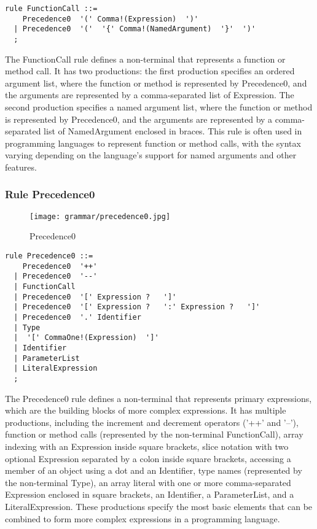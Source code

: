 \begin{lstlisting}
rule FunctionCall ::=
    Precedence0  '(' Comma!(Expression)  ')' 
  | Precedence0  '('  '{' Comma!(NamedArgument)  '}'  ')' 
  ;
\end{lstlisting}

The FunctionCall rule defines a non-terminal that represents a function or method call. It has two productions: the first production specifies an ordered argument list, where the function or method is represented by Precedence0, and the arguments are represented by a comma-separated list of Expression. The second production specifies a named argument list, where the function or method is represented by Precedence0, and the arguments are represented by a comma-separated list of NamedArgument enclosed in braces. This rule is often used in programming languages to represent function or method calls, with the syntax varying depending on the language's support for named arguments and other features.

\subsubsection*{Rule Precedence0}

\begin{figure}[!ht]
\centering
\texttt{[image: grammar/precedence0.jpg]}
\caption{Precedence0}
\end{figure}

\begin{lstlisting}
rule Precedence0 ::=
    Precedence0  '++' 
  | Precedence0  '--' 
  | FunctionCall 
  | Precedence0  '[' Expression ?   ']' 
  | Precedence0  '[' Expression ?   ':' Expression ?   ']' 
  | Precedence0  '.' Identifier 
  | Type 
  |  '[' CommaOne!(Expression)  ']' 
  | Identifier 
  | ParameterList 
  | LiteralExpression 
  ;
\end{lstlisting}

The Precedence0 rule defines a non-terminal that represents primary expressions, which are the building blocks of more complex expressions. It has multiple productions, including the increment and decrement operators ('++' and '--'), function or method calls (represented by the non-terminal FunctionCall), array indexing with an Expression inside square brackets, slice notation with two optional Expression separated by a colon inside square brackets, accessing a member of an object using a dot and an Identifier, type names (represented by the non-terminal Type), an array literal with one or more comma-separated Expression enclosed in square brackets, an Identifier, a ParameterList, and a LiteralExpression. These productions specify the most basic elements that can be combined to form more complex expressions in a programming language.

